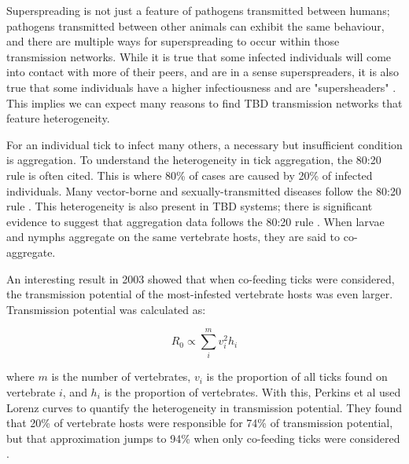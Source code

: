 \documentclass{article}
\begin{document}
Superspreading is not just a feature of pathogens transmitted between humans; pathogens transmitted between other animals can exhibit the same behaviour, and there are multiple ways for superspreading to occur within those transmission networks. While it is true that some infected individuals will come into contact with more of their peers, and are in a sense superspreaders, it is also true that some individuals have a higher infectiousness and are "supersheaders" \cite{VanderWaal_2016}. This implies we can expect many reasons to find TBD transmission networks that feature heterogeneity. 

For an individual tick to infect many others, a necessary but insufficient condition is aggregation. To understand the heterogeneity in tick aggregation, the 80:20 rule is often cited. This is where 80\% of cases are caused by 20\% of infected individuals. Many vector-borne and sexually-transmitted diseases follow the 80:20 rule \cite{Woolhouse1997}. This heterogeneity is also present in TBD systems; there is significant evidence to suggest that aggregation data follows the 80:20 rule \cite{Ferreri2014, Brunner2008, JohnstoneRobertson2020}. When larvae and nymphs aggregate on the same vertebrate hosts, they are said to co-aggregate. 

An interesting result in 2003 showed that when co-feeding ticks were considered, the transmission potential of the most-infested vertebrate hosts was even larger. Transmission potential was calculated as:

\begin{equation} \label{PerkinsR0Estimate}
	R_0 \propto \sum_i^m v_i^2 h_i
\end{equation}

where $ m $ is the number of vertebrates, $ v_i $ is the proportion of all ticks found on vertebrate $ i $, and $ h_i $ is the proportion of vertebrates. With this, Perkins et al used Lorenz curves to quantify the heterogeneity in transmission potential. They found that 20\% of vertebrate hosts were responsible for 74\% of transmission potential, but that approximation jumps to 94\% when only co-feeding ticks were considered \cite{Perkins_2003}.
\end{document}
